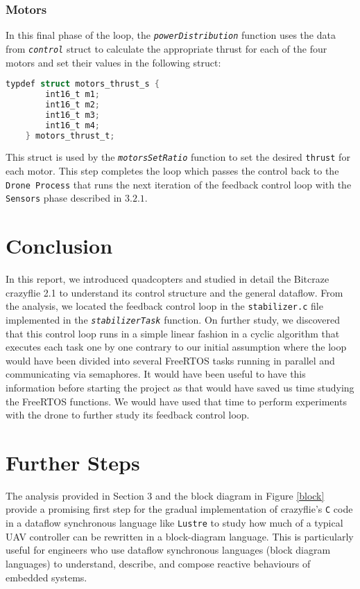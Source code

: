 \documentclass[10pt, a4paper]{article}
\newcommand{\textFunc}[1]{\texttt{\textit{#1}}}
\newcommand{\textDef}[1]{\texttt{#1}}
\newcommand{\fig}[1]{Figure \ref{#1}}
\newcommand{\todo}{\textbf{TODO}}
\begin{document}
    \subsubsection{Motors}
    \label{motors}
        In this final phase of the loop, the \textFunc{powerDistribution} function uses the data from \textFunc{control} struct to calculate the appropriate thrust for each of the four motors and set their values in the following struct:    
        \begin{lstlisting}[language=C]
    typdef struct motors_thrust_s {
        int16_t m1;
        int16_t m2;
        int16_t m3;
        int16_t m4;
    } motors_thrust_t;
        \end{lstlisting}
        This struct is used by the \textFunc{motorsSetRatio} function to set the desired \textDef{thrust} for each motor. This step completes the loop which passes the control back to the \textDef{Drone Process} that runs the next iteration of the feedback control loop with the \textDef{Sensors} phase described in $3.2.1$.


    
\section{Conclusion}
    In this report, we introduced quadcopters and studied in detail the Bitcraze crazyflie 2.1 to understand its control structure and the general dataflow. From the analysis, we located the feedback control loop in the \textDef{stabilizer.c} file implemented in the \textFunc{stabilizerTask} function. On further study, we discovered that this control loop runs in a simple linear fashion in a cyclic algorithm that executes each task one by one contrary to our initial assumption where the loop would have been divided into several FreeRTOS tasks running in parallel and communicating via semaphores. It would have been useful to have this information before starting the project as that would have saved us time studying the FreeRTOS functions. We would have used that time to perform experiments with the drone to further study its feedback control loop.
\section{Further Steps}
    The analysis provided in Section 3 and the block diagram in \fig{block} provide a promising first step for the gradual implementation of crazyflie's \textDef{C} code in a dataflow synchronous language like \textDef{Lustre} to study how much of a typical UAV controller can be rewritten in a block-diagram language. This is particularly useful for engineers who use dataflow synchronous languages (block diagram languages) to understand, describe, and compose reactive behaviours of embedded systems.
\end{document}
